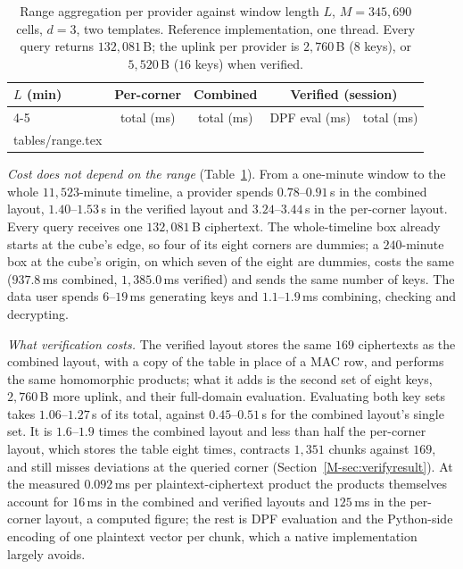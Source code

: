 \documentclass[11pt,a4paper]{article}
\newcommand{\mref}[1]{\ref{M-#1}}
\newlength{\tblwidth}\setlength{\tblwidth}{\linewidth}
\begin{document}
\begin{table}[htbp]
\caption{Range aggregation per provider against window length $L$,
$M=345{,}690$ cells, $d=3$, two templates. Reference implementation, one
thread. Every query returns $132{,}081$\,B; the uplink per provider is
$2{,}760$\,B ($8$ keys), or $5{,}520$\,B ($16$ keys) when verified.}
\label{tab:range}
\centering
\footnotesize
\begin{tabular*}{\tblwidth}{@{\extracolsep{\fill}}lcccc@{}}
\toprule
$L$ (min) & Per-corner & Combined & \multicolumn{2}{c}{Verified (session)} \\
\cmidrule(lr){4-5}
 & total (ms) & total (ms) & DPF eval (ms) & total (ms) \\
\midrule
{} tables/range.tex 
\bottomrule
\end{tabular*}
\end{table}

\emph{Cost does not depend on the range} (Table~\ref{tab:range}). From a
one-minute window to the whole $11{,}523$-minute timeline, a provider spends
$0.78$--$0.91$\,s in the combined layout, $1.40$--$1.53$\,s in the verified
layout and $3.24$--$3.44$\,s in the per-corner layout. Every query receives one
$132{,}081$\,B ciphertext. The whole-timeline box already starts at the cube's
edge, so four of its eight corners are dummies; a $240$-minute box at the
cube's origin, on which seven of the eight are dummies, costs the same
($937.8$\,ms combined, $1{,}385.0$\,ms verified) and sends the same number of
keys. The data user spends $6$--$19$\,ms generating keys and $1.1$--$1.9$\,ms
combining, checking and decrypting.

\emph{What verification costs.} The verified layout stores the same $169$
ciphertexts as the combined layout, with a copy of the table in place of a MAC
row, and performs the same homomorphic products; what it adds is the second
set of eight keys, $2{,}760$\,B more uplink, and their full-domain evaluation.
Evaluating both key sets takes $1.06$--$1.27$\,s of its total, against
$0.45$--$0.51$\,s for the combined layout's single set. It is $1.6$--$1.9$ times
the combined layout and less than half the per-corner layout, which stores the
table eight times, contracts $1{,}351$ chunks against $169$, and still misses
deviations at the queried corner (Section~\mref{sec:verifyresult}). At the
measured $0.092$\,ms per plaintext-ciphertext product the products themselves
account for $16$\,ms in the combined and verified layouts and $125$\,ms in the
per-corner layout, a computed figure; the rest is DPF evaluation and the
Python-side encoding of one plaintext vector per chunk, which a native
implementation largely avoids.
\end{document}

